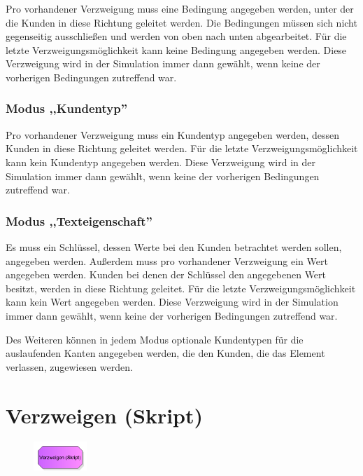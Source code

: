 Pro vorhandener Verzweigung muss eine Bedingung angegeben werden, unter der die Kunden in diese Richtung
geleitet werden. Die Bedingungen müssen sich nicht gegenseitig ausschließen und werden von oben nach unten
abgearbeitet. Für die letzte Verzweigungsmöglichkeit kann keine Bedingung angegeben werden. Diese Verzweigung
wird in der Simulation immer dann gewählt, wenn keine der vorherigen Bedingungen zutreffend war.

\subsubsection*{Modus ,,Kundentyp''}

Pro vorhandener Verzweigung muss ein Kundentyp angegeben werden, dessen Kunden in diese Richtung
geleitet werden. Für die letzte Verzweigungsmöglichkeit kann kein Kundentyp angegeben werden. Diese Verzweigung
wird in der Simulation immer dann gewählt, wenn keine der vorherigen Bedingungen zutreffend war.

\subsubsection*{Modus ,,Texteigenschaft''}

Es muss ein Schlüssel, dessen Werte bei den Kunden betrachtet werden sollen, angegeben werden.
Außerdem muss pro vorhandener Verzweigung ein Wert angegeben werden. Kunden bei denen der Schlüssel
den angegebenen Wert besitzt, werden in diese Richtung geleitet. Für die letzte Verzweigungsmöglichkeit
kann kein Wert angegeben werden. Diese Verzweigung wird in der Simulation immer dann gewählt,
wenn keine der vorherigen Bedingungen zutreffend war.

Des Weiteren können in jedem Modus optionale Kundentypen für die auslaufenden Kanten angegeben
werden, die den Kunden, die das Element verlassen, zugewiesen werden.


\section{Verzweigen (Skript)}
\label{ref:ModelElementDecideJS}

\begin{figure}
\vspace{-22pt}
\includegraphics[width=2cm]{imageModelElementDecideJS.png}
\vspace{-22pt}
\end{figure}

